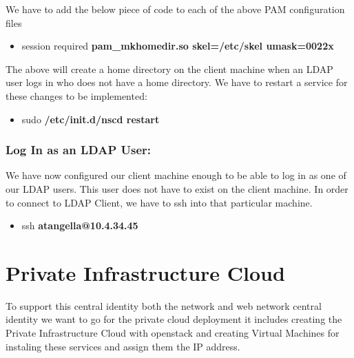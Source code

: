 \documentclass[12pt]{report}
\begin{document}
	We have to add the below piece of code to each of the above PAM configuration files
		\begin{itemize}
		\item session required \textbf{pam\_mkhomedir.so skel=/etc/skel umask=0022x}
		\end{itemize}
		
		The above will create a home directory on the client machine when an LDAP user logs in who does not have a home directory.
		We have to restart a service for these changes to be implemented:
		\begin{itemize}
		\item sudo \textbf{/etc/init.d/nscd restart}		
		\end{itemize}
		
		\subsection{Log In as an LDAP User:}
		We have now configured our client machine enough to be able to log in as one of our LDAP users. This user does not have to exist on the client machine.
		In order to connect to LDAP Client, we have to ssh into that particular machine.
		\begin{itemize}
		\item ssh \textbf{atangella@10.4.34.45}
		\end{itemize}


\chapter{Private Infrastructure Cloud}
To support this central identity both the network and web network central identity we want to go for the private cloud deployment it includes creating the Private Infrastructure Cloud with openstack and creating Virtual Machines for instaling these services and assign them the IP address.
\end{document}
